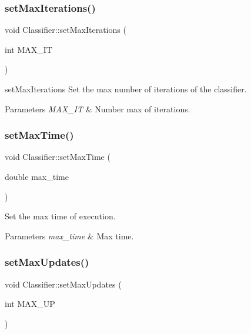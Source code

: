 \subsubsection{\texorpdfstring{set\+Max\+Iterations()}{setMaxIterations()}}
{\footnotesize\ttfamily void Classifier\+::set\+Max\+Iterations (\begin{DoxyParamCaption}\item[{int}]{M\+A\+X\+\_\+\+IT }\end{DoxyParamCaption})}



set\+Max\+Iterations Set the max number of iterations of the classifier. 


\begin{DoxyParams}{Parameters}
{\em M\+A\+X\+\_\+\+IT} & Number max of iterations. \\
\hline
\end{DoxyParams}
\mbox{\label{class_classifier_a5da324a0de94b7171484f3b1f1f22fbd}} 
\subsubsection{\texorpdfstring{set\+Max\+Time()}{setMaxTime()}}
{\footnotesize\ttfamily void Classifier\+::set\+Max\+Time (\begin{DoxyParamCaption}\item[{double}]{max\+\_\+time }\end{DoxyParamCaption})}



Set the max time of execution. 


\begin{DoxyParams}{Parameters}
{\em max\+\_\+time} & Max time. \\
\hline
\end{DoxyParams}
\mbox{\label{class_classifier_ad8930d5e6002299bdb840d4542229f02}} 
\subsubsection{\texorpdfstring{set\+Max\+Updates()}{setMaxUpdates()}}
{\footnotesize\ttfamily void Classifier\+::set\+Max\+Updates (\begin{DoxyParamCaption}\item[{int}]{M\+A\+X\+\_\+\+UP }\end{DoxyParamCaption})}



